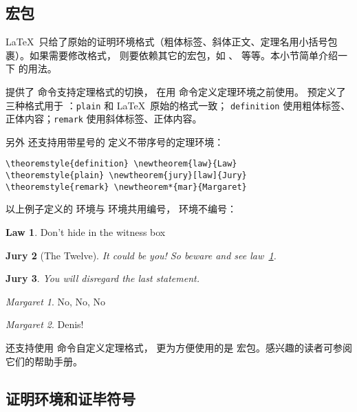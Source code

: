 \subsection{ 宏包}\label{subsec:amsthm}

\LaTeX\ 只给了原始的证明环境格式（粗体标签、斜体正文、定理名用小括号包裹）。如果需要修改格式，
则要依赖其它的宏包，如 、 等等。本小节简单介绍一下  的用法。

 提供了  命令支持定理格式的切换，
在用  命令定义定理环境之前使用。
 预定义了三种格式用于 ：\texttt{plain} 和 \LaTeX\ 原始的格式一致；
\texttt{defi\-ni\-tion} 使用粗体标签、正体内容；\texttt{remark} 使用斜体标签、正体内容。

另外  还支持用带星号的  定义不带序号的定理环境：
\begin{verbatim}
\theoremstyle{definition} \newtheorem{law}{Law}
\theoremstyle{plain} \newtheorem{jury}[law]{Jury}
\theoremstyle{remark} \newtheorem*{mar}{Margaret}
\end{verbatim}
\theoremstyle{definition} \newtheorem{law}{Law}
\theoremstyle{plain} \newtheorem{jury}[law]{Jury}
\theoremstyle{remark} \newtheorem*{mar}{Margaret}

以上例子定义的  环境与  环境共用编号， 环境不编号：
\begin{example}
\begin{law} \label{law:box}
Don’t hide in the witness box
\end{law}
\begin{jury}[The Twelve]
It could be you! So beware and
see law~\ref{law:box}.\end{jury}
\begin{jury}
You will disregard the last
statement.\end{jury}
\begin{mar}No, No, No\end{mar}
\begin{mar}Denis!\end{mar}
\end{example}

 还支持使用  命令自定义定理格式，
更为方便使用的是  宏包。感兴趣的读者可参阅它们的帮助手册。

\subsection{证明环境和证毕符号}\label{subsec:proof}

